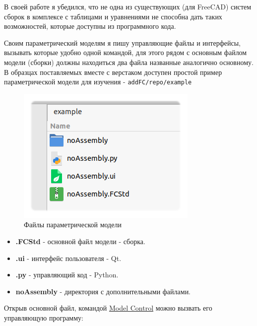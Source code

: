 \documentclass[a4paper,12pt]{article}
\begin{document}
В своей работе я убедился, что не одна из существующих (для FreeCAD) систем сборок в комплексе с таблицами и уравнениями не способна дать таких возможностей, которые доступны из программного кода.

Своим параметрический моделям я пишу управляющие файлы и интерфейсы, вызывать которые удобно одной командой, для этого рядом с основным файлом модели (сборки) должны находиться два файла названные аналогично основному.\\

В образцах поставляемых вместе с верстаком доступен простой пример параметрической модели для изучения - \verb|addFC/repo/example|

\begin{figure}[htp]
\centering
\includegraphics[scale=0.8]{img/example.png}
\caption{Файлы параметрической модели}
\label{sec:example}
\end{figure}

\begin{itemize}
	\item \textbf{.FCStd} - основной файл модели - сборка.
	\item \textbf{.ui} - интерфейс пользователя - Qt.
	\item \textbf{.py} - управляющий код - Python.
	\item \textbf{noAssembly} - директория с дополнительными файлами.
\end{itemize}

\pagebreak

\begin{flushleft}Открыв основной файл, командой \hyperref[sec:3]{Model Control} можно вызвать его управляющую программу:\end{flushleft}
\end{document}
